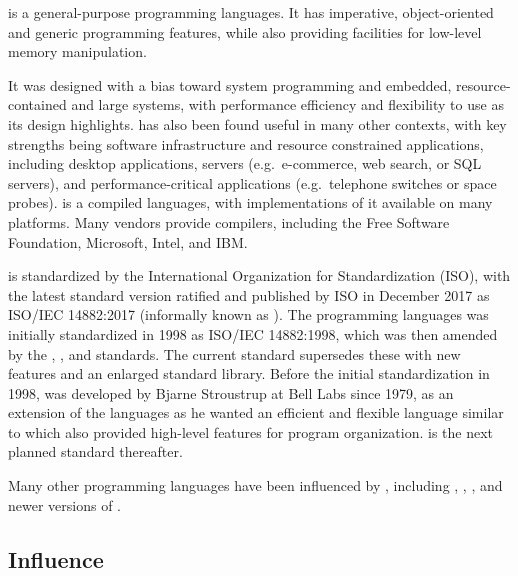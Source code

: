 \documentclass[../languages.tex]{subfiles}
\begin{document}
\label{sec:c__}

 is a general-purpose programming languages. It has imperative,
object-oriented and generic programming features, while also providing
facilities for low-level memory manipulation.

It was designed with a bias toward system programming and embedded,
resource-contained and large systems, with performance efficiency and
flexibility to use as its design highlights.  has also been found
useful in many other contexts, with key strengths being software infrastructure
and resource constrained applications, including desktop applications, servers
(e.g.\ e-commerce, web search, or SQL servers), and performance-critical
applications (e.g.\ telephone switches or space probes).  is a compiled
languages, with implementations of it available on many platforms.  Many
vendors provide  compilers, including the Free Software Foundation,
Microsoft, Intel, and IBM.

 is standardized by the International Organization for Standardization
(ISO), with the latest standard version ratified and published by ISO in
December 2017 as ISO/IEC 14882:2017 (informally known as ). The
 programming languages was initially standardized in 1998 as ISO/IEC
14882:1998, which was then amended by the , , and
 standards. The current  standard supersedes these with new
features and an enlarged standard library. Before the initial standardization
in 1998,  was developed by Bjarne Stroustrup at Bell Labs since 1979,
as an extension of the  languages as he wanted an efficient and
flexible language similar to  which also provided high-level features for
program organization.   is the next planned standard thereafter.

Many other programming languages have been influenced by , including
, , , and newer versions of .

\subsection{Influence}
\label{sub:influence}
\end{document}
